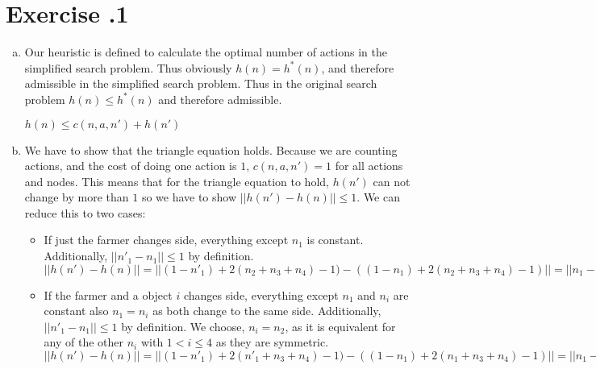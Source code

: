 \documentclass[11pt]{scrartcl}
\newcounter{sheetnr}
\newenvironment{exercise}[2][]{\section*{Exercise \thesheetnr.#2\expandafter\ifstrempty\expandafter{#1}{}{\ (#1)}}}{}
\newenvironment{subexercises}{\begin{enumerate}[a), font=\bfseries, wide, labelindent=0pt]}{\end{enumerate}}
\begin{document}
\begin{exercise}[Heuristics]{1}
\begin{subexercises}
            \begin{itemize}
                \item $(1-n_1) = 1$ when the farmer is on the goal shore and thus has to go back and get another object from the starting shore. $(1-n_1) = 0$ if he is already on the starting shore and thus doesn't have to travel back to the starting shore to get another object.
                \item $2(n_2 + n_3 + n_4) - 1$: for each object he brings from the starting shore he has to travel back except for the last one he brings to the other side.
            \end{itemize}
        
            \item Our heuristic is defined to calculate the optimal number of actions in the simplified search problem. Thus obviously $h(n) = h^*(n)$, and therefore admissible in the simplified search problem. Thus in the original search problem $h(n) \leq h^*(n)$ and therefore admissible.
        
            \begin{center}
                $h(n) \leq c(n,a,n') + h(n')$
            \end{center}
        
            \item We have to show that the triangle equation holds. Because we are counting actions, and the cost of doing one action is $1$, $c(n,a,n') = 1$ for all actions and nodes. This means that for the triangle equation to hold, $h(n')$ can not change by more than $1$ so we have to show $||h(n') - h(n)|| \leq 1$. We can reduce this to two cases:
            \begin{itemize}
                \item If just the farmer changes side, everything except $n_1$ is constant. Additionally, $||{n'}_1 - n_1 || \leq 1$ by definition. \\
                $||h(n') - h(n)|| = ||(1 - {n'}_1) + 2(n_2 + n_3 + n_4) - 1) - ((1 - n_1) + 2(n_2 + n_3 + n_4) - 1)|| = ||n_1 - {n'}_1|| \leq 1$ \\
                \item If the farmer and a object $i$ changes side, 
                everything except $n_1$ and $n_i $ are constant also $n_1 = n_i$ as both change to the same side. Additionally, $||{n'}_1 - n_1 || \leq 1$ by definition. We choose, $n_i = n_2$, as it is equivalent for any of the other $n_i$ with $1 < i \leq 4$ as they are symmetric. \\
                $||h(n') - h(n)|| = ||(1 - {n'}_1) + 2({n'}_1 + n_3 + n_4) - 1) - ((1 - n_1) + 2(n_1 + n_3 + n_4) - 1)|| = ||n_1 - {n'}_1 + 2{n'}_1 - 2n_1 || = || {n'}_1 - n_1 || \leq 1$ \\
            \end{itemize}
        

\end{subexercises}
\end{exercise}
\end{document}
